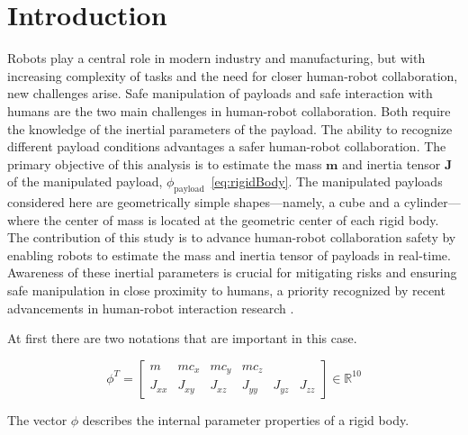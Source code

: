 \chapter{Introduction}
    
    Robots play a central role in modern industry and manufacturing, but with increasing complexity of tasks and the need for closer human-robot collaboration, new challenges arise. Safe manipulation of payloads and safe interaction with humans are the two main challenges in human-robot collaboration. Both require the knowledge of the inertial parameters of the payload. The ability to recognize different payload conditions advantages a safer human-robot collaboration. The primary objective of this analysis is to estimate the mass $\boldsymbol{m}$ and inertia tensor $\boldsymbol{J}$ of the manipulated payload, $\phi_{\text{payload}}$~\eqref{eq:rigidBody}. The manipulated payloads considered here are geometrically simple shapes—namely, a cube and a cylinder—where the center of mass is located at the geometric center of each rigid body. The contribution of this study is to advance human-robot collaboration safety by enabling robots to estimate the mass and inertia tensor of payloads in real-time. Awareness of these inertial parameters is crucial for mitigating risks and ensuring safe manipulation in close proximity to humans, a priority recognized by recent advancements in human-robot interaction research \cite{bai2024sensorless, Popov2019, nadeau2022fast, kurdas2022online, su2021deep, haninger2022model, HANINGER2023104431}.

    \vspace{1em}
    At first there are two notations that are important in this case.
    
    \begin{equation}
    \phi^T = \begin{bmatrix} m & m c_x & m c_y & m c_z \\
    J_{xx} & J_{xy} & J_{xz} & J_{yy} & J_{yz} & J_{zz} \end{bmatrix} \in \mathbb{R}^{10}
    \label{eq:rigidBody}
    \end{equation}
    
    The vector $\phi$ describes the internal parameter properties of a rigid body.
    
